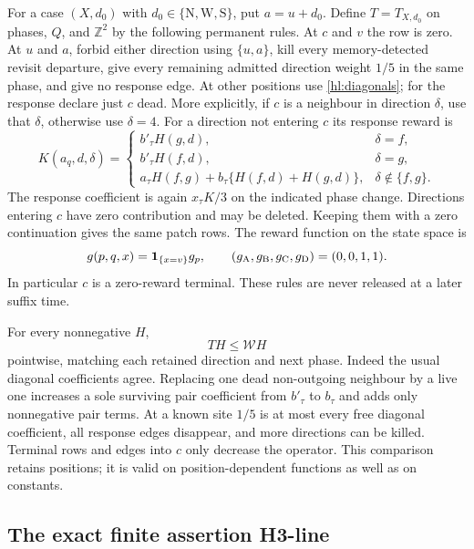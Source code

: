 For a case $(X,d_0)$ with $d_0\in\{\mathrm N,\mathrm W,\mathrm S\}$,
put $a=u+d_0$.  Define $T=T_{X,d_0}$ on phases, $Q$, and
$\mathbb Z^2$ by the following permanent rules.
At $c$ and $v$ the row is zero.  At $u$ and $a$, forbid either
direction using $\{u,a\}$, kill every memory-detected revisit
departure, give every remaining admitted direction weight $1/5$
in the same phase, and give no response edge.  At other positions
use \eqref{hl:diagonals}; for the response declare just $c$ dead.
More explicitly, if $c$ is a neighbour in direction $\delta$, use
that $\delta$, otherwise use $\delta=4$.  For a direction not
entering $c$ its response reward is
\begin{equation}\label{hl:stationaryreward}
 K(a_q,d,\delta)=\begin{cases}
 b'_\tau H(g,d),&\delta=f,\\
 b'_\tau H(f,d),&\delta=g,\\
 a_\tau H(f,g)+b_\tau\{H(f,d)+H(g,d)\},&\delta\notin\{f,g\}.
 \end{cases}
\end{equation}
The response coefficient is again $x_\tau K/3$ on the indicated
phase change.  Directions entering $c$ have zero contribution and
may be deleted.  Keeping them with a zero continuation gives the
same patch rows.  The reward function on the state space is
\begin{equation}\label{hl:g}
  g(p,q,x)=\mathbf1_{\{x=v\}}g_p,\qquad(g_{\rm A},g_{\rm B},g_{\rm C},g_{\rm D})=(0,0,1,1).
\end{equation}
In particular $c$ is a zero-reward terminal.  These rules are never
released at a later suffix time.

For every nonnegative $H$,
\begin{equation}\label{hl:entrywise}
 TH\le\mathcal WH
\end{equation}
pointwise, matching each retained direction and next phase.
Indeed the usual diagonal coefficients agree.  Replacing one
dead non-outgoing neighbour by a live one increases a sole surviving
pair coefficient from $b'_\tau$ to $b_\tau$ and adds only
nonnegative pair terms.  At a known site $1/5$ is at most every
free diagonal coefficient, all response edges disappear, and more
directions can be killed.  Terminal rows and edges into $c$ only
decrease the operator.  This comparison retains positions; it is
valid on position-dependent functions as well as on constants.

\subsection{The exact finite assertion H3-line}

